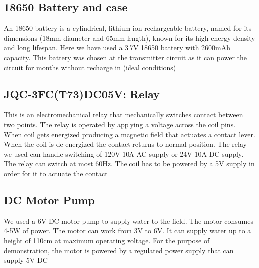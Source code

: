 \vspace*{1cm}

\newpage

\subsection{18650 Battery and case}


An 18650 battery is a cylindrical, lithium-ion rechargeable battery,
named for its dimensions (18mm diameter and 65mm length), known for
its high energy density and long lifespan. Here we have used a 3.7V
18650 battery with 2600mAh capacity. This battery was chosen at the
transmitter circuit as it can power the circuit for months without
recharge in (ideal conditions)

\vspace*{1cm}

\subsection{JQC-3FC(T73)DC05V: Relay}

\setlength{\columnsep}{.3cm}

This is an electromechanical relay that mechanically switches contact
between two points. The relay is operated by applying a voltage
across the coil pins. When coil gets energized producing a magnetic
field that actuates a contact lever. When the coil is de-energized
the contact returns to normal position. The relay we used can handle
switching of 120V 10A AC supply or 24V 10A DC supply. The relay can
switch at most 60Hz. The coil has to be powered by a 5V supply in
order for it to actuate the contact

\subsection{DC Motor Pump}


We used a 6V DC motor pump to supply water to the field. The motor
consumes 4-5W of power. The motor can work from 3V to 6V. It can
supply water up to a height of 110cm at maximum operating voltage.
For the purpose of demonstration, the motor is powered by a regulated
power supply that can supply 5V DC

\vspace*{1cm}

